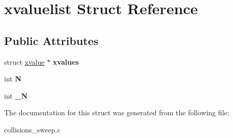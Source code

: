 \hypertarget{structxvaluelist}{
\section{xvaluelist Struct Reference}
\label{structxvaluelist}
}
\subsection*{Public Attributes}
\begin{DoxyCompactItemize}
\item 
\hypertarget{structxvaluelist_aaeea98f4613b083a3095c46469e808d8}{
struct \hyperlink{structxvalue}{xvalue} $\ast$ {\bfseries xvalues}}
\label{structxvaluelist_aaeea98f4613b083a3095c46469e808d8}

\item 
\hypertarget{structxvaluelist_a55f65c1952ca64b175c3c1287ea8ae4c}{
int {\bfseries N}}
\label{structxvaluelist_a55f65c1952ca64b175c3c1287ea8ae4c}

\item 
\hypertarget{structxvaluelist_a98a4bbe8f114eae2e3a9c7dfcb5a7efc}{
int {\bfseries \_\-N}}
\label{structxvaluelist_a98a4bbe8f114eae2e3a9c7dfcb5a7efc}

\end{DoxyCompactItemize}


The documentation for this struct was generated from the following file:\begin{DoxyCompactItemize}
\item 
collisions\_\-sweep.c\end{DoxyCompactItemize}
